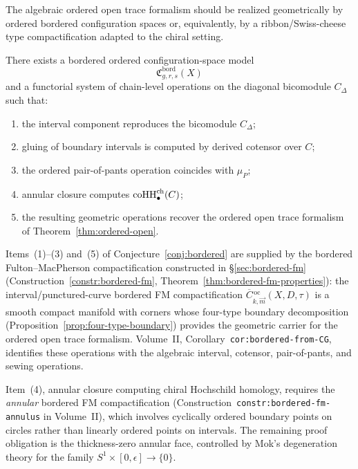 The algebraic ordered open trace formalism should be realized geometrically by ordered bordered
configuration spaces or, equivalently, by a ribbon/Swiss-cheese type compactification adapted to the
chiral setting.

\begin{conjecture}
\ClaimStatusConjectured
\label{conj:bordered}
There exists a bordered ordered configuration-space model
\[
\mathfrak C^{\mathrm{bord}}_{g,r,s}(X)
\]
and a functorial system of chain-level operations on the diagonal bicomodule $C_\Delta$ such that:
\begin{enumerate}[label=(\arabic*)]
\item the interval component reproduces the bicomodule $C_\Delta$;
\item gluing of boundary intervals is computed by derived cotensor over $C$;
\item the ordered pair-of-pants operation coincides with $\mu_P$;
\item annular closure computes $\operatorname{coHH}^{\mathrm{ch}}_\bullet(C)$;
\item the resulting geometric operations recover the ordered open trace formalism of
Theorem~\ref{thm:ordered-open}.
\end{enumerate}
\end{conjecture}

\begin{remark}
\label{rem:bordered-partial-resolution}
Items~(1)--(3) and~(5) of Conjecture~\ref{conj:bordered} are supplied
by the bordered Fulton--MacPherson compactification constructed in
\S\ref{sec:bordered-fm} (Construction~\ref{constr:bordered-fm},
Theorem~\ref{thm:bordered-fm-properties}):
the interval/punctured-curve bordered FM compactification
$\overline{C}{}^{\,\mathrm{oc}}_{k,\vec{m}}(X, D, \tau)$ is a smooth
compact manifold with corners whose four-type boundary decomposition
(Proposition~\ref{prop:four-type-boundary}) provides the geometric
carrier for the ordered open trace formalism. Volume~II,
Corollary~\texttt{cor:bordered-from-CG}, identifies these operations
with the algebraic interval, cotensor, pair-of-pants, and sewing
operations.

Item~(4), annular closure computing chiral Hochschild homology,
requires the \emph{annular} bordered FM compactification
(Construction~\texttt{constr:bordered-fm-annulus} in Volume~II), which
involves cyclically ordered boundary points on circles rather than
linearly ordered points on intervals. The remaining proof obligation is
the thickness-zero annular face, controlled by Mok's degeneration theory
for the family $S^1\times[0,\epsilon]\to\{0\}$.
\end{remark}

